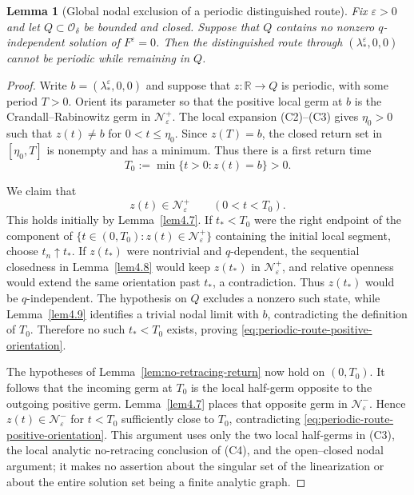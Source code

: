 \documentclass[11pt,reqno]{amsart}
\numberwithin{equation}{section}
\newtheorem{lemma}[theorem]{Lemma}
\theoremstyle{definition}
\theoremstyle{remark}
\begin{document}
\begin{lemma}[Global nodal exclusion of a periodic distinguished route]
\label{lem:global-nodal-loop}
Fix $\varepsilon>0$ and let $Q\subset\mathcal O_\delta$ be bounded and
closed.  Suppose that $Q$ contains no nonzero $q$-independent solution
of $F^\varepsilon=0$.  Then the distinguished route through
$(\lambda_*^\varepsilon,0,0)$ cannot be periodic while remaining in
$Q$.
\end{lemma}
\begin{proof}
Write $b=(\lambda_*^\varepsilon,0,0)$ and suppose that
$z:\mathbb R\to Q$ is periodic, with some period $T>0$.  Orient its
parameter so that the positive local germ at $b$ is the
Crandall--Rabinowitz germ in $\mathcal N_\varepsilon^+$.  The local
expansion (C2)--(C3) gives $\eta_0>0$ such that $z(t)\ne b$ for
$0<t\leq\eta_0$.  Since $z(T)=b$, the closed return set in
$[\eta_0,T]$ is nonempty and has a minimum.  Thus there is a first
return time
\[
 T_0:=\min\{t>0:z(t)=b\}>0.
\]

We claim that
\begin{equation}\label{eq:periodic-route-positive-orientation}
 z(t)\in\mathcal N_\varepsilon^+\qquad(0<t<T_0).
\end{equation}
This holds initially by Lemma~\ref{lem4.7}.  If $t_*<T_0$ were the
right endpoint of the component of
$\{t\in(0,T_0):z(t)\in\mathcal N_\varepsilon^+\}$ containing the
initial local segment, choose $t_n\uparrow t_*$.  If $z(t_*)$ were
nontrivial and $q$-dependent, the sequential closedness in
Lemma~\ref{lem4.8} would keep $z(t_*)$ in
$\mathcal N_\varepsilon^+$, and relative openness would extend the
same orientation past $t_*$, a contradiction.  Thus $z(t_*)$ would
be $q$-independent.  The hypothesis on $Q$ excludes a nonzero such
state, while Lemma~\ref{lem4.9} identifies a trivial nodal limit with
$b$, contradicting the definition of $T_0$.  Therefore no such
$t_*<T_0$ exists, proving
\eqref{eq:periodic-route-positive-orientation}.

The hypotheses of Lemma~\ref{lem:no-retracing-return} now hold on
$(0,T_0)$.  It follows that the incoming germ at $T_0$ is the local
half-germ opposite to the outgoing positive germ.  Lemma~\ref{lem4.7}
places that opposite germ in $\mathcal N_\varepsilon^-$.  Hence
$z(t)\in\mathcal N_\varepsilon^-$ for $t<T_0$ sufficiently close to
$T_0$, contradicting
\eqref{eq:periodic-route-positive-orientation}.  This argument uses
only the two local half-germs in (C3), the local analytic
no-retracing conclusion of (C4), and the open--closed nodal argument;
it makes no assertion about the singular set of the linearization or
about the entire solution set being a finite analytic graph.
\end{proof}
\end{document}
